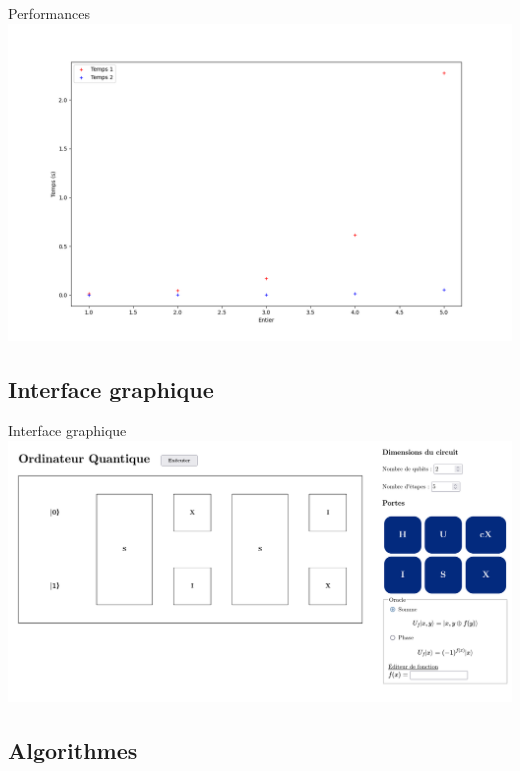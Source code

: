 \documentclass[french]{beamer}
\begin{document}
\begin{frame}{Performances}
    \includegraphics[scale=0.3]{Opti.png}
\end{frame}


\subsection{Interface graphique}


\begin{frame}{Interface graphique}
    \includegraphics[scale=0.22]{I4.png}
\end{frame}


\subsection{Algorithmes}
\end{document}

